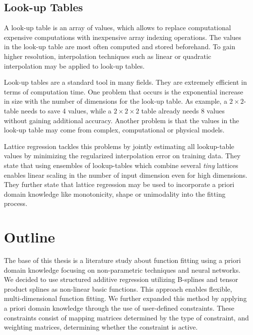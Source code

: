 \documentclass[10pt,a4paper]{article}
\begin{document}
\subsection{Look-up Tables}

A look-up table is an array of values, which allows to replace computational expensive computations with inexpensive array indexing operations. The values in the look-up table are most often computed and stored beforehand. To gain higher resolution, interpolation techniques such as linear or quadratic interpolation may be applied to look-up tables. 

Look-up tables are a standard tool in many fields. They are extremely efficient in terms of computation time. One problem that occurs is the exponential increase in size with the number of dimensions for the look-up table. As example, a $2 \times 2$-table needs to save 4 values, while a $2 \times 2 \times 2$ table already needs 8 values without gaining additional accuracy. Another problem is that the values in the look-up table may come from complex, computational or physical models. 

Lattice regression tackles this problems by jointly estimating all lookup-table values by minimizing the regularized interpolation error on training data. \cite{garcia2009lattice} They state that using ensembles of lookup-tables which combine several \emph{tiny} lattices enables linear scaling in the number of input dimension even for high dimensions. \cite{fard2016fast} They further state that lattice regression may be used to incorporate a priori domain knowledge like monotonicity, shape or unimodality into the fitting process. \cite{gupta2016monotonic} \cite{you2017deep}

\section{Outline}

The base of this thesis is a literature study about function fitting using a priori domain knowledge focusing on non-parametric techniques and neural networks. We decided to use structured additive regression \cite{fahrmeir2013regression} utilizing B-splines and tensor product splines as non-linear basic functions. This approach enables flexible, multi-dimensional function fitting. We further expanded this method by applying a priori domain knowledge through the use of user-defined constraints. These constraints consist of mapping matrices determined by the type of constraint, and weighting matrices, determining whether the constraint is active. \cite{hofner2011monotonicity}
\end{document}
